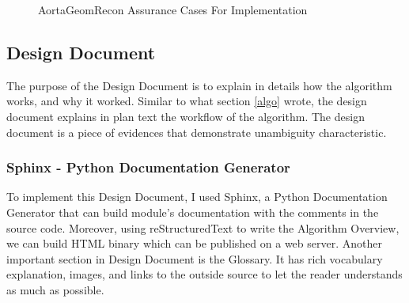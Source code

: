 \begin{figure}[H]
    \centering
    \caption[AortaGeomRecon Assurance Cases For Implementation]{AortaGeomRecon Assurance Cases For Implementation}
    \label{fig_agr_ac_gi}
\end{figure}

\subsection{Design Document}
The purpose of the Design Document \cite{DD} is to explain in details how the algorithm works, and why it worked. Similar to what section \ref{algo} wrote, the design document explains in plan text the workflow of the algorithm. The design document is a piece of evidences that demonstrate unambiguity characteristic.

\subsubsection{Sphinx - Python Documentation Generator}
To implement this Design Document, I used Sphinx, a Python Documentation Generator that can build module's documentation with the comments in the source code. Moreover, using reStructuredText to write the Algorithm Overview, we can build HTML binary which can be published on a web server. Another important section in Design Document is the Glossary. It has rich vocabulary explanation, images, and links to the outside source to let the reader understands as much as possible.

